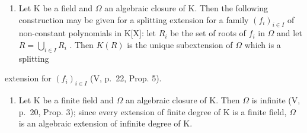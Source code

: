 \begin{enumerate}
\def\labelenumi{\arabic{enumi})}
\setcounter{enumi}{2}
\tightlist
\item
  Let K be a field and \(\Omega\) an algebraic closure of K. Then the following construction may be given for a splitting extension for a family \((f_{i})_{i\in I}\) of non-constant polynomials in K{[}X{]}: let \(R_{i}\) be the set of roots of \(f_{i}\) in \(\Omega\) and let \(R=\bigcup_{i\in I}R_{i}\) . Then \(K(R)\) is the unique subextension of \(\Omega\) which is a splitting
\end{enumerate}

extension for \((f_i)_{i\in I}\) (V, p.~22, Prop. 5).

\begin{enumerate}
\def\labelenumi{\arabic{enumi})}
\setcounter{enumi}{3}
\tightlist
\item
  Let K be a finite field and \(\Omega\) an algebraic closure of K. Then \(\Omega\) is infinite (V, p.~20, Prop. 3); since every extension of finite degree of K is a finite field, \(\Omega\) is an algebraic extension of infinite degree of K.
\end{enumerate}

